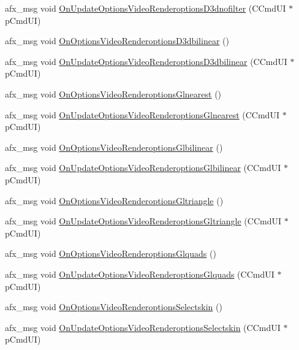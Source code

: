\begin{DoxyCompactItemize}
\item 
afx\+\_\+msg void \mbox{\hyperlink{class_main_wnd_a09f3b77c773efa5548d4edbc23e2f1cb}{On\+Update\+Options\+Video\+Renderoptions\+D3dnofilter}} (C\+Cmd\+UI $\ast$p\+Cmd\+UI)
\item 
afx\+\_\+msg void \mbox{\hyperlink{class_main_wnd_abc93855509cbfc4d8c063d7be9d765d4}{On\+Options\+Video\+Renderoptions\+D3dbilinear}} ()
\item 
afx\+\_\+msg void \mbox{\hyperlink{class_main_wnd_a0e30aec4baedb265a010ea7a65c1cecb}{On\+Update\+Options\+Video\+Renderoptions\+D3dbilinear}} (C\+Cmd\+UI $\ast$p\+Cmd\+UI)
\item 
afx\+\_\+msg void \mbox{\hyperlink{class_main_wnd_a02eb06936ef0d4723a0bf743db3d929b}{On\+Options\+Video\+Renderoptions\+Glnearest}} ()
\item 
afx\+\_\+msg void \mbox{\hyperlink{class_main_wnd_a919aee70c540401f59a34852550fe698}{On\+Update\+Options\+Video\+Renderoptions\+Glnearest}} (C\+Cmd\+UI $\ast$p\+Cmd\+UI)
\item 
afx\+\_\+msg void \mbox{\hyperlink{class_main_wnd_afff6d21ce58320731fae2b0f38390640}{On\+Options\+Video\+Renderoptions\+Glbilinear}} ()
\item 
afx\+\_\+msg void \mbox{\hyperlink{class_main_wnd_a164bd7358a8e4bab78e3b9378914e533}{On\+Update\+Options\+Video\+Renderoptions\+Glbilinear}} (C\+Cmd\+UI $\ast$p\+Cmd\+UI)
\item 
afx\+\_\+msg void \mbox{\hyperlink{class_main_wnd_a80f5fb3891f417bc919adc26f5773a08}{On\+Options\+Video\+Renderoptions\+Gltriangle}} ()
\item 
afx\+\_\+msg void \mbox{\hyperlink{class_main_wnd_ac7ba8a582332e116ac1619d9fcbdafc8}{On\+Update\+Options\+Video\+Renderoptions\+Gltriangle}} (C\+Cmd\+UI $\ast$p\+Cmd\+UI)
\item 
afx\+\_\+msg void \mbox{\hyperlink{class_main_wnd_adc9d14bd286462fdf5f04111352de799}{On\+Options\+Video\+Renderoptions\+Glquads}} ()
\item 
afx\+\_\+msg void \mbox{\hyperlink{class_main_wnd_a4914ee86ae355c18c88b733db04529bb}{On\+Update\+Options\+Video\+Renderoptions\+Glquads}} (C\+Cmd\+UI $\ast$p\+Cmd\+UI)
\item 
afx\+\_\+msg void \mbox{\hyperlink{class_main_wnd_a38b0a1dbd8af4407e43866565ffb9bad}{On\+Options\+Video\+Renderoptions\+Selectskin}} ()
\item 
afx\+\_\+msg void \mbox{\hyperlink{class_main_wnd_a313b7202736612b30754e6b321246f28}{On\+Update\+Options\+Video\+Renderoptions\+Selectskin}} (C\+Cmd\+UI $\ast$p\+Cmd\+UI)

\end{DoxyCompactItemize}
